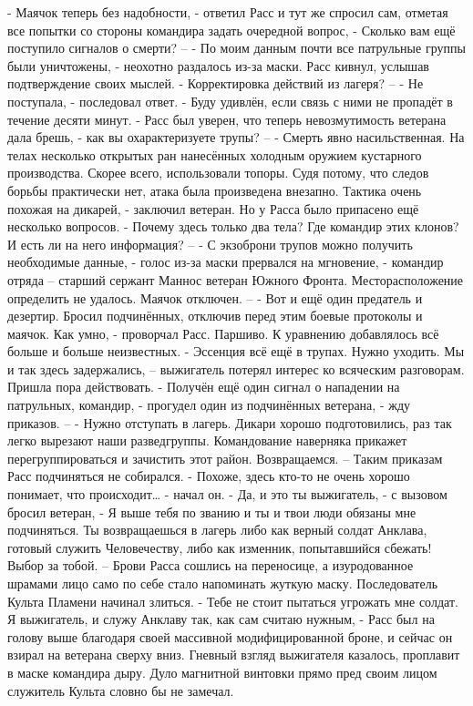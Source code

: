 \documentclass[a4paper, 12pt]{report}
\begin{document}
	- Маячок теперь без надобности, - ответил Расс и тут же спросил сам, отметая все попытки со стороны командира задать очередной вопрос, - Сколько вам ещё поступило сигналов о смерти? –
	- По моим данным почти все патрульные группы были уничтожены, - неохотно раздалось из-за маски. Расс кивнул, услышав подтверждение своих мыслей.
	- Корректировка действий из лагеря? –
	- Не поступала, - последовал ответ.
	- Буду удивлён, если связь с ними не пропадёт в течение десяти минут. - Расс был уверен, что теперь невозмутимость ветерана дала брешь, - как вы охарактеризуете трупы? –
	- Смерть явно насильственная. На телах несколько открытых ран нанесённых холодным оружием кустарного производства. Скорее всего, использовали топоры. Судя потому, что следов борьбы практически нет, атака была произведена внезапно. Тактика очень похожая на дикарей, - заключил ветеран. Но у Расса было припасено ещё несколько вопросов.
	- Почему здесь только два тела? Где командир этих клонов? И есть ли на него информация? –
	- С экзоброни трупов можно получить необходимые данные, - голос из-за маски прервался на мгновение, - командир отряда – старший сержант Маннос ветеран Южного Фронта. Месторасположение определить не удалось. Маячок отключен. –
	- Вот и ещё один предатель и дезертир. Бросил подчинённых, отключив перед этим боевые протоколы и маячок. Как умно, - проворчал Расс. 
Паршиво. К уравнению добавлялось всё больше и больше неизвестных.
 - Эссенция всё ещё в трупах. Нужно уходить. Мы и так здесь задержались, – выжигатель потерял интерес ко всяческим разговорам. Пришла пора действовать.
	- Получён ещё один сигнал о нападении на патрульных, командир, - прогудел один из подчинённых ветерана, - жду приказов. –
	- Нужно отступать в лагерь. Дикари хорошо подготовились, раз так легко вырезают наши разведгруппы. Командование наверняка прикажет перегруппироваться и зачистить этот район. Возвращаемся. –
	Таким приказам Расс подчиняться не собирался.
	- Похоже, здесь кто-то не очень хорошо понимает, что происходит… - начал он.
	- Да, и это ты выжигатель, - с вызовом бросил ветеран, - Я выше тебя по званию и ты и твои люди обязаны мне подчиняться. Ты возвращаешься в лагерь либо как верный солдат Анклава, готовый служить Человечеству, либо как изменник, попытавшийся сбежать! Выбор за тобой. –
	Брови Расса сошлись на переносице, а изуродованное шрамами лицо само по себе стало напоминать жуткую маску. Последователь Культа Пламени начинал злиться.
	- Тебе не стоит пытаться угрожать мне солдат. Я выжигатель, и служу Анклаву так, как сам считаю нужным, - Расс был на голову выше благодаря своей массивной модифицированной броне, и сейчас он взирал на ветерана сверху вниз. Гневный взгляд выжигателя казалось, проплавит в маске командира дыру. Дуло магнитной винтовки прямо пред своим лицом служитель Культа словно бы не замечал.
\end{document}
